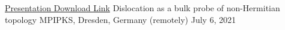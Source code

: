 

\begin{cventries}

  \cventry
    {\href{https://drive.google.com/file/d/18EtxINc68yc_Dt_sxsVkAIQNs8viJxYq/view?usp=sharing}{Presentation Download Link}} %
    {Dislocation as a bulk probe of non-Hermitian topology} %
    {MPIPKS, Dresden, Germany (remotely)} %
    {July 6, 2021} %
    {
      \begin{cvitems} %
      \end{cvitems}
    }

\end{cventries}
